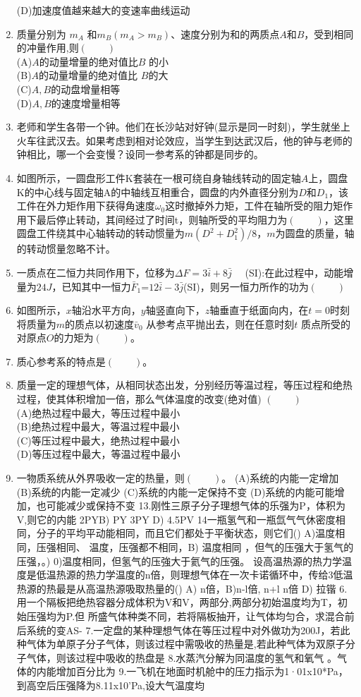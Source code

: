 \begin{enumerate}
(D)加速度值越来越大的变速率曲线运动
\item 质量分别为 $m_A$ 和$m_B (m_A>m_B)$、速度分别为和的两质点$A$和$B$，受到相同的冲量作用,则$(\qquad)$\\
(A)$A$的动量增量的绝对值比$B$ 的小\\
(B)$A$的动量增量的绝对值比 $B$的大\\
(C)$A,B$的动盘增量相等\\
(D)$A,B$的速度增量相等
\item 老师和学生各带一个钟。他们在长沙站对好钟(显示是同一时刻)，学生就坐上火车往武汉去。如果考虑到相对论效应，当学生到达武汉后，他的钟与老师的钟相比，哪一个会变慢？设同一参考系的钟都是同步的。
\item 如图所示，一圆盘形工件K套装在一根可绕自身轴线转动的固定轴$A$上，圆盘K的中心线与固定轴A的中轴线互相重合，圆盘的内外直径分别为$D$和$D_1$，该工件在外力矩作用下获得角速度$\omega_0$这时撤掉外力矩，工件在轴所受的阻力矩作用下最后停止转动，其间经过了时间t，则轴所受的平均阻力为$(\qquad)$，这里圆盘工件绕其中心轴转动的转动惯量为$m(D^2+D^2_1)/8$，$m$为圆盘的质量，轴的转动惯量忽略不计。
\item 一质点在二恒力共同作用下，位移为$\Delta F=3\bar i +8\bar j \quad$ (SI):在此过程中，动能增量为$24J$，已知其中一恒力$\bar F_1$=$12 \bar i-3 \bar j$(SI)，则另一恒力所作的功为$(\qquad)$
\item 如图所示，$x$轴沿水平方向，$y$轴竖直向下，$z$轴垂直于纸面向内，在$t=0$时刻将质量为$m$的质点以初速度$\bar v_0$ 从参考点平抛出去，则在任意时刻$t$ 质点所受的对原点$O$的力矩为$(\qquad)$。
\item 质心参考系的特点是$(\qquad)$。
\item 质量一定的理想气体，从相同状态出发，分别经历等温过程，等压过程和绝热过程，使其体积增加一倍，那么气体温度的改变(绝对值) $(\qquad)$\\
(A)绝热过程中最大，等压过程中最小\\
(B)绝热过程中最大，等温过程中最小\\
(C)等压过程中最大，绝热过程中最小\\
(D)等压过程中最大，等温过程中最小
\item 一物质系统从外界吸收一定的热量，则$(\qquad)$。
(A)系统的内能一定增加
(B)系统的内能一定减少
(C)系统的内能一定保持不变
(D)系统的内能可能增加，也可能减少或保持不变
13.刚性三原子分子理想气体的乐强为P，体积为V,则它的内能
2PYB) PY
3PY
D) 4.5PV
14一瓶氢气和一瓶氙气气休密度相同，分子的平均平动能相同，而且它们都处于平衡状态，则它们()
A)温度相同，压强相同、
温度，压强都不相同，B)
温度相同 ，但气的压强大于氢气的压强，。)
0)温度相同，但氢气的压強大于氦气的压强。
设高温热源的热力学温度是低温热源的热力学温度的n倍，则理想气体在一次卡诺循环中，传给3低温热源的热最是从高温热源吸取热量的()
A) n倍，B)n-l倍,
n+l
n倍
D)
拉锴
6.用一个隔板把绝热容器分成体积为V和V，两部分,两部分初始温度均为T，初始压强均为P.但
所盛气体种类不同，若将隔板抽开，让气体均匀合，求混合前后系统的变AS-
7.一定盘的某种理想气体在等压过程中对外做功为200J，若此种气体为单原子分子气体，则该过程中需吸收的热量是,若此种气体为双原子分子气体，则该过程中吸收的热盘是
8.水蒸汽分解为同温度的氢气和氧气 。气体的内能增加百分比为
9.一飞机在地面时机舱中的压力指示为1·01x10*Pa，到高空后压强降为8.11x10'Pa,设大气温度均
\end{enumerate}
